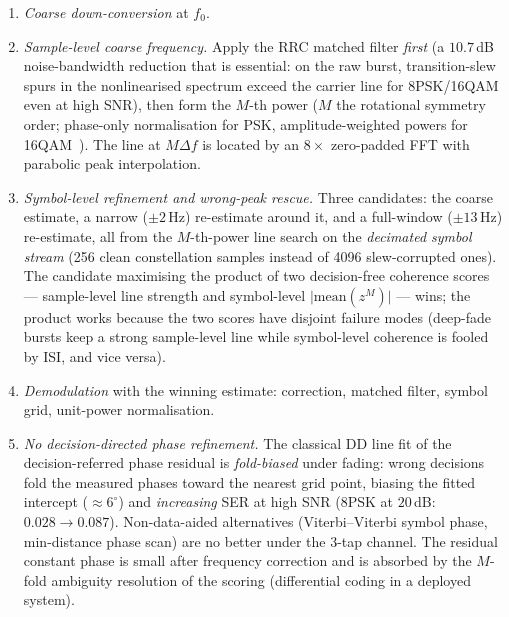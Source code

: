 \documentclass[journal]{IEEEtran}
\begin{document}
\begin{enumerate}
  \item \emph{Coarse down-conversion} at $f_0$.
  \item \emph{Sample-level coarse frequency.} Apply the RRC matched
        filter \emph{first} (a $10.7$\,dB noise-bandwidth reduction that
        is essential: on the raw burst, transition-slew spurs in the
        nonlinearised spectrum exceed the carrier line for 8PSK/16QAM
        even at high SNR), then form the $M$-th power ($M$ the
        rotational symmetry order; phase-only normalisation for PSK,
        amplitude-weighted powers for 16QAM~\cite{viterbi1983nonlinear}).
        The line at $M \Delta f$ is located by an $8\times$ zero-padded
        FFT with parabolic peak interpolation.
  \item \emph{Symbol-level refinement and wrong-peak rescue.} Three
        candidates: the coarse estimate, a narrow ($\pm 2$\,Hz)
        re-estimate around it, and a full-window ($\pm 13$\,Hz)
        re-estimate, all from the $M$-th-power line search on the
        \emph{decimated symbol stream} (256 clean constellation samples
        instead of 4096 slew-corrupted ones). The candidate maximising
        the product of two decision-free coherence scores ---
        sample-level line strength and symbol-level
        $\big|\mathrm{mean}(z^M)\big|$ --- wins; the product works
        because the two scores have disjoint failure modes (deep-fade
        bursts keep a strong sample-level line while symbol-level
        coherence is fooled by ISI, and vice versa).
  \item \emph{Demodulation} with the winning estimate: correction,
        matched filter, symbol grid, unit-power normalisation.
  \item \emph{No decision-directed phase refinement.} The classical DD
        line fit of the decision-referred phase residual is
        \emph{fold-biased} under fading: wrong decisions fold the
        measured phases toward the nearest grid point, biasing the
        fitted intercept ($\approx 6^\circ$) and \emph{increasing} SER
        at high SNR (8PSK at $20$\,dB: $0.028 \to 0.087$). Non-data-aided
        alternatives (Viterbi--Viterbi symbol
        phase, min-distance phase scan) are no better under the 3-tap
        channel. The residual constant phase is small after frequency
        correction and is absorbed by the $M$-fold ambiguity resolution
        of the scoring (differential coding in a deployed system).
\end{enumerate}
\end{document}
